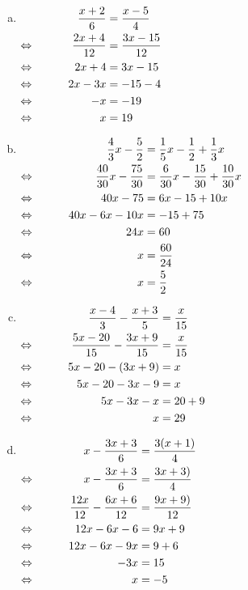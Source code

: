 \documentclass[12pt]{article}
\begin{document}
\begin{solution}
\vspace{-2\topsep}
\begin{enumerate}[(a)]
\item $\begin{aligned}[t]
     && \dfrac{x+2}{6}&=\dfrac{x-5}{4}\\
\Leftrightarrow\mkern40mu && \dfrac{2x+4}{12}&=\dfrac{3x-15}{12}\\
\Leftrightarrow\mkern40mu && 2x + 4	&= 3x - 15\\
\Leftrightarrow\mkern40mu && 2x - 3x	&= - 15 - 4\\
\Leftrightarrow\mkern40mu && - x	&= - 19\\
\Leftrightarrow\mkern40mu && x	&= 19\\
\end{aligned}$
\item $\begin{aligned}[t]
     && \dfrac{4}{3}x-\dfrac{5}{2}&=\dfrac{1}{5}x-\dfrac{1}{2}+\dfrac{1}{3}x\\
\Leftrightarrow\mkern40mu && \dfrac{40}{30}x-\dfrac{75}{30}&=\dfrac{6}{30}x-\dfrac{15}{30}+\dfrac{10}{30}x\\
\Leftrightarrow\mkern40mu && 40x - 75	&= 6x - 15 + 10x\\
\Leftrightarrow\mkern40mu && 40x - 6x - 10x	&= - 15 + 75\\
\Leftrightarrow\mkern40mu && 24x	&= 60\\
\Leftrightarrow\mkern40mu && x	&= \dfrac{60}{24}\\
\Leftrightarrow\mkern40mu && x	&= \dfrac{5}{2}\\
\end{aligned}$
\item $\begin{aligned}[t]
     && \dfrac{x-4}{3}-\dfrac{x+3}{5}&=\dfrac{x}{15}\\
\Leftrightarrow\mkern40mu && \dfrac{5x-20}{15}-\dfrac{3x+9}{15}&=\dfrac{x}{15}\\
\Leftrightarrow\mkern40mu && 5x - 20 - (3x + 9)	&= x\\
\Leftrightarrow\mkern40mu && 5x - 20 - 3x - 9	&= x\\
\Leftrightarrow\mkern40mu && 5x - 3x - x	&= 20 + 9\\
\Leftrightarrow\mkern40mu && x	&= 29\\
\end{aligned}$
\item $\begin{aligned}[t]
     && x-\dfrac{3x+3}{6}&=\dfrac{3(x+1)}{4}\\
\Leftrightarrow\mkern40mu && x-\dfrac{3x+3}{6}&=\dfrac{3x+3)}{4}\\
\Leftrightarrow\mkern40mu && \dfrac{12x}{12}-\dfrac{6x+6}{12}&=\dfrac{9x+9)}{12}\\
\Leftrightarrow\mkern40mu && 12x - 6x - 6	&= 9x + 9\\
\Leftrightarrow\mkern40mu && 12x - 6x - 9x	&= 9 + 6\\
\Leftrightarrow\mkern40mu && - 3x	&= 15\\
\Leftrightarrow\mkern40mu && x	&= - 5\\
\end{aligned}$
\end{enumerate}
\end{solution}
\end{document}
